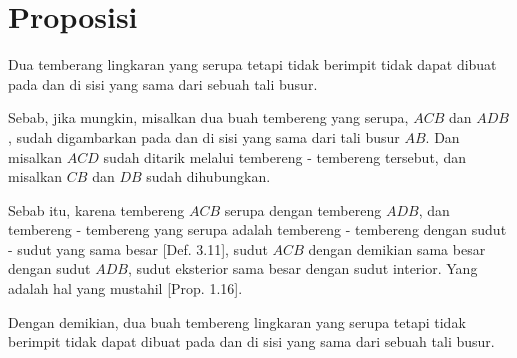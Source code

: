 \documentclass[a4paper]{book}
\begin{document}
\section*{\centering Proposisi \thesection}
Dua temberang lingkaran yang serupa tetapi tidak berimpit tidak dapat
dibuat pada dan di sisi yang sama dari sebuah tali busur.
\begin{center}
\end{center}
Sebab, jika mungkin, misalkan dua buah tembereng yang serupa, $ACB$ dan 
$ADB$, sudah digambarkan pada dan di sisi yang sama dari 
tali busur $AB$. Dan misalkan $ACD$ sudah ditarik melalui tembereng - tembereng
tersebut, dan misalkan $CB$ dan $DB$ sudah dihubungkan.

Sebab itu, karena tembereng $ACB$ serupa dengan tembereng $ADB$, dan 
tembereng - tembereng yang serupa adalah tembereng - tembereng dengan sudut - 
sudut yang sama besar [Def. 3.11], sudut $ACB$ dengan demikian sama besar 
dengan sudut $ADB$, sudut eksterior sama besar dengan sudut interior. Yang
adalah hal yang mustahil [Prop. 1.16].

Dengan demikian, dua buah tembereng lingkaran yang serupa tetapi tidak berimpit
tidak dapat dibuat pada dan di sisi yang sama dari sebuah tali busur.
\end{document}
